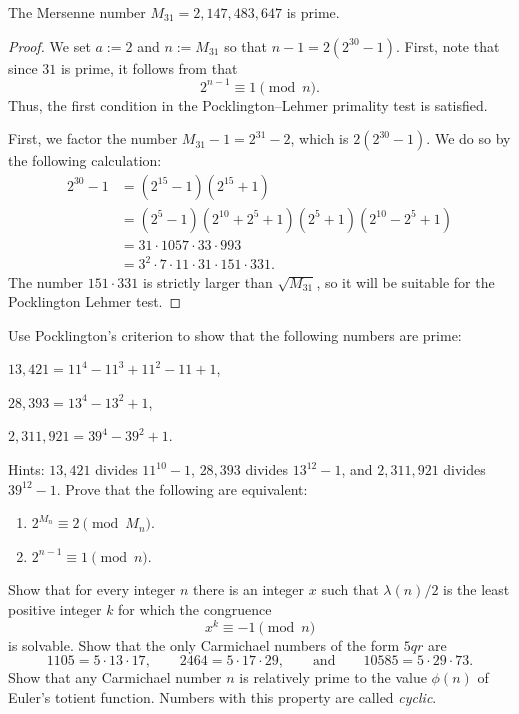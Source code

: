 \begin{proposition}
  The Mersenne number $M_{31}=2,147,483,647$ is prime.
\end{proposition}

\begin{proof}
  We set $a:=2$ and $n:=M_{31}$ so that $n-1 =2(2^{30}-1)$. First, note that since $31$ is prime, it follows from  that
  \begin{equation*}
    2^{n-1}\equiv 1\pmod{n}.
  \end{equation*}
  Thus, the first condition in the Pocklington--Lehmer primality test is satisfied.
  
  First, we factor the number $M_{31}-1=2^{31}-2$, which is $2(2^{30}-1)$. We do so by the following calculation:
  \begin{align*}
    2^{30}-1 & = (2^{15}-1)(2^{15}+1) \\
             & = (2^5-1)(2^{10}+2^5+1)(2^5+1)(2^{10}-2^{5}+1) \\
             & = 31\cdot 1057\cdot 33\cdot 993 \\
             & = 3^2\cdot 7 \cdot 11\cdot 31 \cdot 151\cdot 331.
  \end{align*}
  The number $151\cdot 331$ is strictly larger than $\sqrt{M_{31}}$, so it will be suitable for the Pocklington Lehmer test.
\end{proof}

\exercises

\begin{routine}
  \exercise Use Pocklington's criterion to show that the following numbers are prime:
  \begin{subexenum}
  \item $13,421=11^4-11^3+11^2-11+1$,
  \item $28,393=13^4-13^2+1$,
  \item $2,311,921=39^4-39^2+1$.
  \end{subexenum}
  Hints: $13,421$ divides $11^{10}-1$, $28,393$ divides $13^{12}-1$, and $2,311,921$ divides $39^{12}-1$.
  \exercise Prove that the following are equivalent:
  \begin{enumerate}
  \item $2^{M_n}\equiv 2\pmod{M_n}$.
  \item $2^{n-1}\equiv 1\pmod{n}$.
  \end{enumerate}
  \exercise Show that for every integer $n$ there is an integer $x$ such that $\lambda(n)/2$ is the least positive integer $k$ for which the congruence
  \begin{equation*}
    x^{k}\equiv -1\pmod{n}
  \end{equation*}
  is solvable.
  \exercise Show that the only Carmichael numbers of the form $5qr$ are
  \begin{equation*}
    1105=5\cdot 13\cdot 17,\qquad 2464=5\cdot 17\cdot 29,\qquad\text{and}\qquad 10585=5\cdot 29\cdot 73.
  \end{equation*}
  \exercise Show that any Carmichael number $n$ is relatively prime to the value $\phi(n)$ of Euler's totient function. Numbers with this property are called \emph{cyclic}.
\end{routine}



